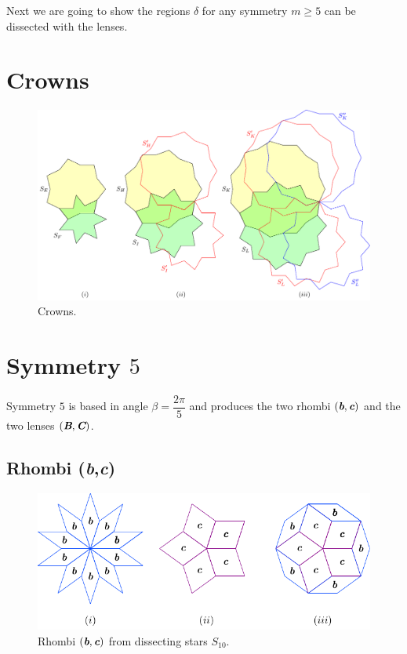 \documentclass[11pt]{article}
\def\mathbi#1{\textbf{\em #1}}
\begin{document}
Next we are going to show the regions $\delta$ for any symmetry $m \ge 5$ can be dissected with the lenses.

\section{Crowns}

\begin{figure}[H]
\centering
\includegraphics[scale=1]{stars/inter-4}
\caption{Crowns.}
\label{fig:stars-inter-4}
\end{figure}




\section{Symmetry $5$}

Symmetry $5$ is based in angle $\beta = \dfrac{2\pi}5$ and produces the two rhombi $(\mathbi{b},\mathbi{c})$ and the two lenses $(\mathbi{B},\mathbi{C})$.

\subsection{Rhombi (\mathbi{b},\mathbi{c})}

\begin{figure}[H]
\centering
\includegraphics[scale=1.1]{bc/rhombi}
\caption{Rhombi $(\mathbi{b},\mathbi{c})$ from dissecting stars $S_{10}$.}
\label{fig:bc-rhombi}
\end{figure}
\end{document}
